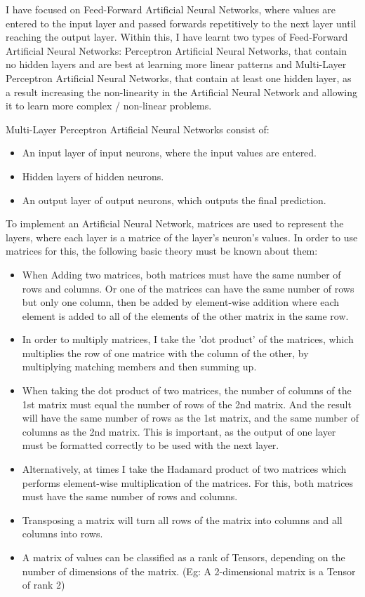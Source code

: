 \documentclass[./project-report/src/latex/project-report.tex]{subfiles}
\begin{document}
I have focused on Feed-Forward Artificial Neural Networks, where values are entered to the input layer and passed forwards repetitively to the next layer until 
reaching the output layer. Within this, I have learnt two types of Feed-Forward Artificial Neural Networks: Perceptron Artificial Neural Networks, that contain no 
hidden layers and are best at learning more linear patterns and Multi-Layer Perceptron Artificial Neural Networks, that contain at least one hidden layer, as a result 
increasing the non-linearity in the Artificial Neural Network and allowing it to learn more complex / non-linear problems.
\vspace{5mm}

Multi-Layer Perceptron Artificial Neural Networks consist of:

\begin{itemize}
    \item An input layer of input neurons, where the input values are entered.
    \item Hidden layers of hidden neurons.
    \item An output layer of output neurons, which outputs the final prediction.
\end{itemize}

To implement an Artificial Neural Network, matrices are used to represent the layers, where each layer is a matrice of the layer's neuron's values. In 
order to use matrices for this, the following basic theory must be known about them:

\begin{itemize}
    \item When Adding two matrices, both matrices must have the same number of rows and columns. Or one of the matrices can have the same number of rows but only one 
          column, then be added by element-wise addition where each element is added to all of the elements of the other matrix in the same row.
    \item In order to multiply matrices, I take the 'dot product' of the matrices, which multiplies the row of one matrice with the column of the other, by multiplying 
          matching members and then summing up.
    \item When taking the dot product of two matrices, the number of columns of the 1st matrix must equal the number of rows of the 2nd matrix. And the result will 
          have the same number of rows as the 1st matrix, and the same number of columns as the 2nd matrix. This is important, as the output of one layer must be formatted 
          correctly to be used with the next layer.
    \item Alternatively, at times I take the Hadamard product of two matrices which performs element-wise multiplication of the matrices. For this, both matrices 
          must have the same number of rows and columns.
    \item Transposing a matrix will turn all rows of the matrix into columns and all columns into rows.
    \item A matrix of values can be classified as a rank of Tensors, depending on the number of dimensions of the matrix. (Eg: A 2-dimensional matrix is a Tensor of 
          rank 2)
\end{itemize}
\end{document}
